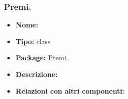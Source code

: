 \subsubsection{Premi.}
\begin{itemize}
  \item \textbf{Nome:}
  \item \textbf{Tipo:} class
  \item \textbf{Package:} Premi.
  \item \textbf{Descrizione:}
  \item \textbf{Relazioni con altri componenti:} 
\end{itemize}













